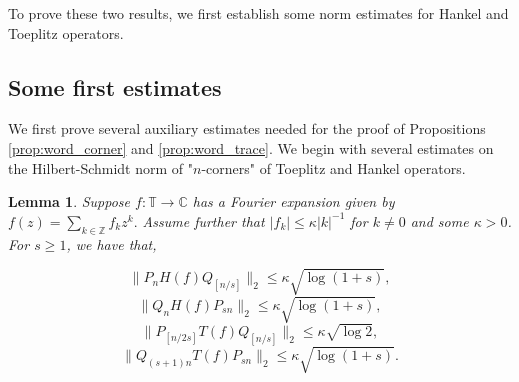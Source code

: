 \documentclass[11pt]{amsart}
\theoremstyle{plain}
\newtheorem{lemma}[theorem]{Lemma}
\theoremstyle{remark}
\numberwithin{equation}{section}
\begin{document}
To prove these two results, we first establish some norm estimates for Hankel and Toeplitz operators.

%
%
%
%


\subsection{Some first estimates}
We first prove several auxiliary estimates needed for the proof of Propositions \ref{prop:word_corner} and \ref{prop:word_trace}.
We begin with several estimates on the Hilbert-Schmidt norm of "$n$-corners" of Toeplitz and Hankel operators. 
\begin{lemma}\label{lemma:hslemma}
Suppose $f:\mathbb{T}\rightarrow \mathbb{C}$ has a Fourier expansion given by $f(z)=\sum_{k\in\mathbb{Z}}f_k z^k.$
Assume further that $|f_k|\leq \kappa |k|^{-1}$ for $k\not=0$ and some $\kappa>0$. 
For $s\geq 1$, we have that, 

\begin{equation} \label{item:hs1}
\|P_nH(f)Q_{[n/s]}\|_2\leq 
%
\kappa\sqrt{\log(1+s)},
\end{equation}
%
\begin{equation}\label{item:hs2}
\|Q_nH(f) P_{sn}\|_2\leq \kappa\sqrt{\log(1+s)},
\end{equation}
% 
\begin{equation} \label{item:hs3}
\|P_{[n/2s]} T(f) Q_{[n/s]}\|_2 \leq \kappa\sqrt{\log 2},
\end{equation}  
%
\begin{equation}\label{item:hs4}
 \|Q_{(s+1)n}T(f)P_{sn}\|_2\leq \kappa\sqrt{\log(1+s)}.
\end{equation}

\end{lemma}
\end{document}
